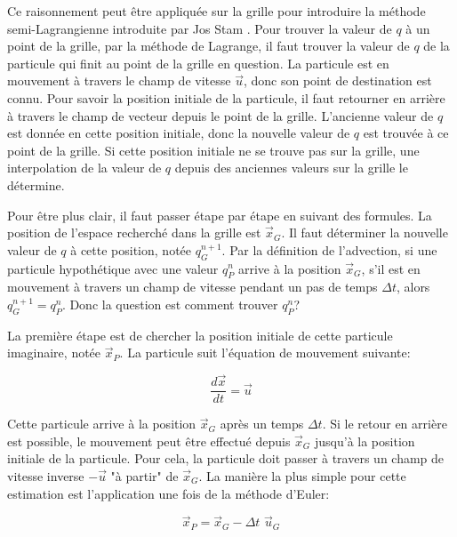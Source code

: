 \documentclass[11pt]{report}
\begin{document}
Ce raisonnement peut être appliquée sur la grille pour introduire la méthode semi-Lagrangienne introduite par Jos Stam \cite{stam-99}. Pour trouver la valeur de $q$ à un point de la grille, par la méthode de Lagrange, il faut trouver la valeur de $q$ de la particule qui finit au point de la grille en question. La particule est en mouvement à travers le champ de vitesse $\overrightarrow{u}$, donc son point de destination est connu. Pour savoir la position initiale de la particule, il faut retourner en arrière à travers le champ de vecteur depuis le point de la grille. L'ancienne valeur de $ q $ est donnée en cette position initiale, donc la nouvelle valeur de $ q $ est trouvée à ce point de la grille. Si cette position initiale ne se trouve pas sur la grille, une interpolation de la valeur de $ q $ depuis des anciennes valeurs sur la grille le détermine.\newline

Pour être plus clair, il faut passer étape par étape en suivant des formules. La position de l'espace recherché dans la grille est $\overrightarrow{x}_G$. Il faut déterminer la nouvelle valeur de $q$ à cette position, notée $q_G^{n+1}$. Par la définition de l'advection, si une particule hypothétique avec une valeur $q_P^n$ arrive à la position $\overrightarrow{x}_G$, s'il est en mouvement à travers un champ de vitesse pendant un pas de temps $\Delta t$, alors $ q_G^{n+1} = q_P^n $. Donc la question est comment trouver $q_P^n$?\newline

La première étape est de chercher la position initiale de cette particule imaginaire, notée $\overrightarrow{x}_P$. La particule suit l'équation de mouvement suivante:

\begin{equation}
\frac{d\overrightarrow{x}}{dt} = \overrightarrow{u}
\end{equation}

Cette particule arrive à la position $\overrightarrow{x}_G $ après un temps $\Delta t$. Si le retour en arrière est possible, le mouvement peut être effectué depuis $\overrightarrow{x}_G $ jusqu'à la position initiale de la particule. Pour cela, la particule doit passer à travers un champ de vitesse inverse $-\overrightarrow{u}$ "à partir" de $\overrightarrow{x}_G$. La manière la plus simple pour cette estimation est  l'application une fois de la méthode d'Euler:

\begin{equation}
\overrightarrow{x}_P = \overrightarrow{x}_G - \Delta t \,\, \overrightarrow{u}_G
\end{equation} 
\end{document}
